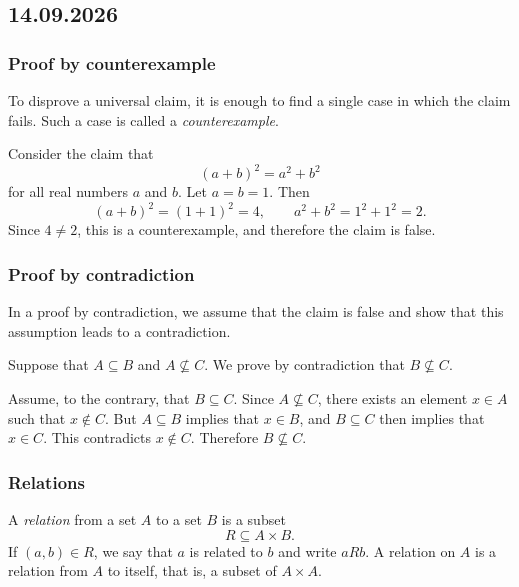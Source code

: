 \documentclass[11pt,a4paper]{amsart}
\begin{document}
\subsection{14.09.2026}

\subsubsection{Proof by counterexample}

To disprove a universal claim, it is enough to find a single case in which the
claim fails. Such a case is called a \emph{counterexample}.

\begin{example}
  Consider the claim that
  \[
    (a+b)^2 = a^2+b^2
  \]
  for all real numbers \(a\) and \(b\). Let \(a=b=1\). Then
  \[
    (a+b)^2 = (1+1)^2 = 4,
    \qquad
    a^2+b^2 = 1^2+1^2 = 2.
  \]
  Since \(4 \neq 2\), this is a counterexample, and therefore the claim is
  false.
\end{example}

\subsubsection{Proof by contradiction}

In a proof by contradiction, we assume that the claim is false and show that
this assumption leads to a contradiction.

\begin{example}
  Suppose that \(A \subseteq B\) and \(A \nsubseteq C\). We prove by
  contradiction that \(B \nsubseteq C\).

  Assume, to the contrary, that \(B \subseteq C\). Since
  \(A \nsubseteq C\), there exists an element \(x \in A\) such that
  \(x \notin C\). But \(A \subseteq B\) implies that \(x \in B\), and
  \(B \subseteq C\) then implies that \(x \in C\). This contradicts
  \(x \notin C\). Therefore \(B \nsubseteq C\).
\end{example}

\subsubsection{Relations}

\begin{definition}
  A \emph{relation} from a set \(A\) to a set \(B\) is a subset
  \[
    R \subseteq A \times B.
  \]
  If \((a,b) \in R\), we say that \(a\) is related to \(b\) and write
  \(aRb\). A relation on \(A\) is a relation from \(A\) to itself, that is, a
  subset of \(A \times A\).
\end{definition}
\end{document}

